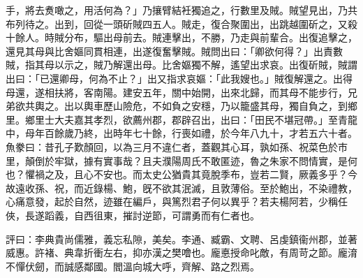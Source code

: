 \begin{pinyinscope}
手，將去煑噉之，用活何為？」乃攘臂結衽獨追之，行數里及賊。賊望見出，乃共布列待之。出到，回從一頭斫賊四五人。賊走，復合聚圍出，出跳越圍斫之，又殺十餘人。時賊分布，驅出母前去。賊連擊出，不勝，乃走與前輩合。出復追擊之，還見其母與比舍嫗同貫相連，出遂復奮擊賊。賊問出曰：「卿欲何得？」出責數賊，指其母以示之，賊乃解還出母。比舍嫗獨不解，遙望出求哀。出復斫賊，賊謂出曰：「已還卿母，何為不止？」出又指求哀嫗：「此我嫂也。」賊復解還之。出得母還，遂相扶將，客南陽。建安五年，關中始開，出來北歸，而其母不能步行，兄弟欲共輿之。出以輿車歷山險危，不如負之安穩，乃以籠盛其母，獨自負之，到鄉里。鄉里士大夫嘉其孝烈，欲薦州郡，郡辟召出，出曰：「田民不堪冠帶。」至青龍中，母年百餘歲乃終，出時年七十餘，行喪如禮，於今年八九十，才若五六十者。魚豢曰：昔孔子歎顏回，以為三月不違仁者，蓋觀其心耳，孰如孫、祝菜色於市里，顛倒於牢獄，據有實事哉？且夫濮陽周氏不敢匿迹，魯之朱家不問情實，是何也？懼禍之及，且心不安也。而太史公猶貴其竟脫季布，豈若二賢，厥義多乎？今故遠收孫、祝，而近錄楊、鮑，旣不欲其泯滅，且敦薄俗。至於鮑出，不染禮教，心痛意發，起於自然，迹雖在編戶，與篤烈君子何以異乎？若夫楊阿若，少稱任俠，長遂蹈義，自西徂東，摧討逆節，可謂勇而有仁者也。

評曰：李典貴尚儒雅，義忘私隙，美矣。李通、臧霸、文聘、呂虔鎮衞州郡，並著威惠。許褚、典韋折衝左右，抑亦漢之樊噲也。龐悳授命叱敵，有周苛之節。龐淯不憚伏劒，而誠感鄰國。閻溫向城大呼，齊解、路之烈焉。


\end{pinyinscope}